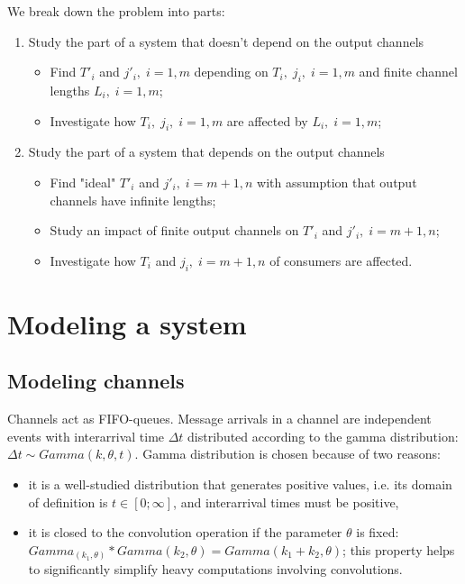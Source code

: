 We break down the problem into parts:
  \begin{enumerate}
  \item Study the part of a system that doesn't depend on the output channels
    \begin{itemize}
    \item Find $T'_{i}$ and $j'_{i}, \; i=1,m$ depending on $T_{i}, \; j_{i}, \; i=1,m$ and finite channel lengths $L_{i}, \; i=1,m$;
    \item Investigate how $T_{i}, \; j_{i}, \; i=1,m$ are affected by $L_{i}, \; i=1,m$;
  \end{itemize}

  \item Study the part of a system that depends on the output channels
    \begin{itemize}
    \item Find "ideal" $T'_{i}$ and $j'_{i}, \; i=m+1,n$ with assumption that output channels have infinite lengths;
    \item Study an impact of finite output channels on $T'_{i}$ and $j'_{i}, \; i=m+1,n$;
    \item Investigate how $T_{i}$ and $j_{i}, \; i=m+1,n$ of consumers are affected.
    \end{itemize}
  \end{enumerate}


\section{Modeling a system}

  \subsection{Modeling channels}
Channels act as FIFO-queues. Message arrivals in a channel are independent events with interarrival time $\Delta t$ distributed according to the gamma distribution: $\Delta t \sim Gamma (k, \theta, t)$. Gamma distribution is chosen because of two reasons:
    \begin{itemize}
    \item it is a well-studied distribution that generates positive values, i.e. its domain of definition is $t \in [0;\infty]$, and interarrival times must be positive,
    \item it is closed to the convolution operation if the parameter $\theta$ is fixed: $Gamma_(k_{1}, \theta) * Gamma (k_{2}, \theta) = Gamma (k_{1} + k_{2}, \theta)$; this property helps to significantly simplify heavy computations involving convolutions.
    \end{itemize}

